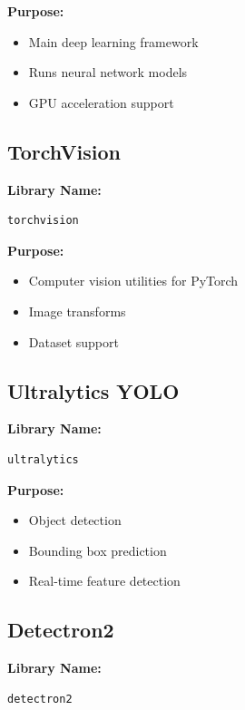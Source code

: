 \documentclass[12pt]{article}
\begin{document}
\textbf{Purpose:}
\begin{itemize}
    \item Main deep learning framework
    \item Runs neural network models
    \item GPU acceleration support
\end{itemize}

\subsection{TorchVision}

\textbf{Library Name:}
\begin{verbatim}
torchvision
\end{verbatim}

\textbf{Purpose:}
\begin{itemize}
    \item Computer vision utilities for PyTorch
    \item Image transforms
    \item Dataset support
\end{itemize}

\subsection{Ultralytics YOLO}

\textbf{Library Name:}
\begin{verbatim}
ultralytics
\end{verbatim}

\textbf{Purpose:}
\begin{itemize}
    \item Object detection
    \item Bounding box prediction
    \item Real-time feature detection
\end{itemize}

\subsection{Detectron2}

\textbf{Library Name:}
\begin{verbatim}
detectron2
\end{verbatim}
\end{document}
